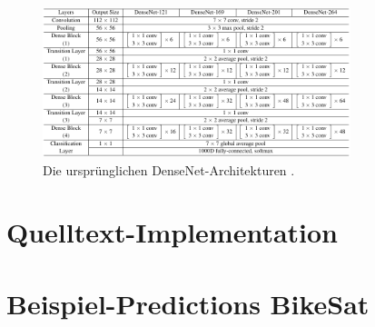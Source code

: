 \begin{figure}
	\centering
	\includegraphics[width=0.8\textwidth]{Bilder/densenet121-architecture.pdf} 
	\caption{Die ursprünglichen DenseNet-Architekturen \cite{Huang.25082016}.}
	\label{fig:densenet121-architecture}
\end{figure} 

\pagebreak

\section{Quelltext-Implementation}



\pagebreak 

\section{Beispiel-Predictions BikeSat}

